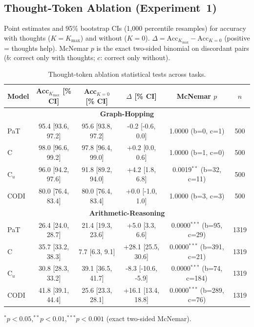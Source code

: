 \subsection{Thought-Token Ablation (Experiment~1)}
\label{app:ablation_stats}

Point estimates and 95\% bootstrap CIs (1{,}000 percentile resamples) for accuracy with thoughts ($K{=}K_{\max}$) and without ($K{=}0$). $\Delta = \text{Acc}_{K_{\max}} - \text{Acc}_{K{=}0}$ (positive = thoughts help). McNemar $p$ is the exact two-sided binomial on discordant pairs ($b$: correct only with thoughts; $c$: correct only without).

\begin{table}[h!]
\centering
\small
\setlength{\tabcolsep}{4pt}
\caption{Thought-token ablation statistical tests across tasks.}
\begin{tabular}{l ccc cc}
\toprule
Model & Acc$_{K_{\max}}$ [\% CI] & Acc$_{K{=}0}$ [\% CI] & $\Delta$ [\% CI] & McNemar $p$ & $n$ \\
\midrule
\multicolumn{6}{c}{\textbf{Graph-Hopping}} \\
\midrule
PaT & 95.4 [93.6, 97.2] & 95.6 [93.8, 97.2] & -0.2 [-0.6, 0.0] & 1.0000 (b=0, c=1) & 500 \\
C & 98.0 [96.6, 99.2] & 97.8 [96.4, 99.0] & +0.2 [0.0, 0.6] & 1.0000 (b=1, c=0) & 500 \\
C$_u$ & 96.0 [94.2, 97.6] & 91.8 [89.2, 94.0] & +4.2 [1.8, 6.8] & 0.0019$^{**}$ (b=32, c=11) & 500 \\
CODI & 80.0 [76.4, 83.4] & 80.0 [76.4, 83.4] & +0.0 [-1.0, 1.0] & 1.0000 (b=3, c=3) & 500 \\
\midrule
\multicolumn{6}{c}{\textbf{Arithmetic-Reasoning}} \\
\midrule
PaT & 26.4 [24.0, 28.7] & 21.4 [19.3, 23.6] & +5.0 [3.3, 6.6] & 0.0000$^{***}$ (b=95, c=29) & 1319 \\
C & 35.7 [33.2, 38.3] & 7.7 [6.3, 9.1] & +28.1 [25.5, 30.6] & 0.0000$^{***}$ (b=391, c=21) & 1319 \\
C$_u$ & 30.8 [28.3, 33.2] & 39.1 [36.5, 41.7] & -8.3 [-10.6, -5.9] & 0.0000$^{***}$ (b=74, c=184) & 1319 \\
CODI & 41.8 [39.1, 44.4] & 25.6 [23.3, 28.1] & +16.1 [13.4, 18.8] & 0.0000$^{***}$ (b=289, c=76) & 1319 \\
\bottomrule
\end{tabular}
\label{tab:ablation_stats_combined}
\end{table}

\noindent$^{*}p{<}0.05$,\quad $^{**}p{<}0.01$,\quad $^{***}p{<}0.001$ (exact two-sided McNemar).
